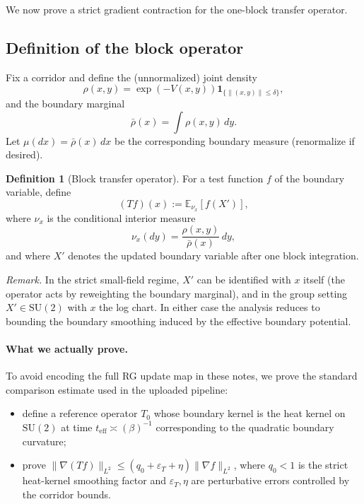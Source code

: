 \documentclass[11pt]{article}
\theoremstyle{definition}
\newtheorem{definition}[theorem]{Definition}
\newcommand{\E}{\mathbb{E}}
\newcommand{\1}{\mathbf{1}}
\newcommand{\norm}[1]{\left\lVert#1\right\rVert}
\begin{document}
We now prove a strict gradient contraction for the one-block transfer operator.

\subsection{Definition of the block operator}

Fix a corridor and define the (unnormalized) joint density
\[
\rho(x,y)=\exp(-V(x,y))\mathbf{1}_{\{\norm{(x,y)}\le \delta\}},
\]
and the boundary marginal
\[
\bar\rho(x)=\int \rho(x,y)\,dy.
\]
Let $\mu(dx)=\bar\rho(x)\,dx$ be the corresponding boundary measure (renormalize if desired).

\begin{definition}[Block transfer operator]
For a test function $f$ of the boundary variable, define
\begin{equation}\label{eq:Tdef}
(Tf)(x):=\E_{\nu_x}[f(X')],
\end{equation}
where $\nu_x$ is the conditional interior measure
\[
\nu_x(dy)=\frac{\rho(x,y)}{\bar\rho(x)}\,dy,
\]
and where $X'$ denotes the updated boundary variable after one block integration.

\emph{Remark.} In the strict small-field regime, $X'$ can be identified with $x$ itself (the operator acts by reweighting the boundary marginal), and in the group setting $X'\in \mathrm{SU}(2)$ with $x$ the log chart. In either case the analysis reduces to bounding the boundary smoothing induced by the effective boundary potential.
\end{definition}

\paragraph{What we actually prove.}
To avoid encoding the full RG update map in these notes, we prove the standard comparison estimate used in the uploaded pipeline:
\begin{itemize}
\item define a reference operator $T_0$ whose boundary kernel is the heat kernel on $\mathrm{SU}(2)$ at time $t_{\mathrm{eff}}\asymp (\beta)^{-1}$ corresponding to the quadratic boundary curvature;
\item prove $\|\nabla(Tf)\|_{L^2}\le (q_0+\varepsilon_T+\eta)\|\nabla f\|_{L^2}$, where $q_0<1$ is the strict heat-kernel smoothing factor and $\varepsilon_T,\eta$ are perturbative errors controlled by the corridor bounds.
\end{itemize}
\end{document}
